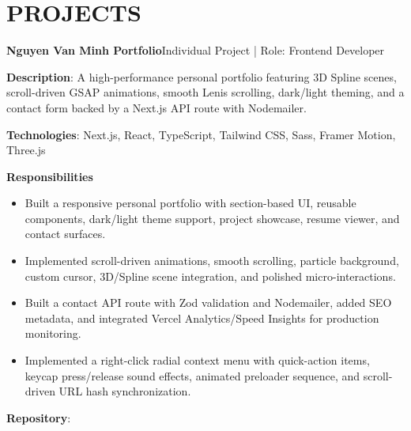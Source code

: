 \section{PROJECTS}
\resumeSubHeadingListStart

  \resumeProjectHeading
    {\textbf{Nguyen Van Minh Portfolio}}{Individual Project | Role: Frontend Developer}
    \resumeItemListStart
      \item \textbf{Description}: A high-performance personal portfolio featuring 3D Spline scenes, scroll-driven GSAP animations,
        smooth Lenis scrolling, dark/light theming, and a contact form backed by a Next.js API route with Nodemailer.
      \item \textbf{Technologies}: Next.js, React, TypeScript, Tailwind CSS, Sass, Framer Motion, Three.js
      \item \textbf{Responsibilities}
        \begin{itemize}
          \item Built a responsive personal portfolio with section-based UI, reusable components, dark/light theme support, project showcase, resume viewer, and contact surfaces.
          \item Implemented scroll-driven animations, smooth scrolling, particle background, custom cursor, 3D/Spline scene integration, and polished micro-interactions.
          \item Built a contact API route with Zod validation and Nodemailer, added SEO metadata, and integrated Vercel Analytics/Speed Insights for production monitoring.
          \item Implemented a right-click radial context menu with quick-action items, keycap press/release sound effects, animated preloader sequence, and scroll-driven URL hash synchronization.
        \end{itemize}
      \item \textbf{Repository}: \href{https://github.com/nvminh162/nguyenvanminh-portfolio-web}{}
    \resumeItemListEnd

